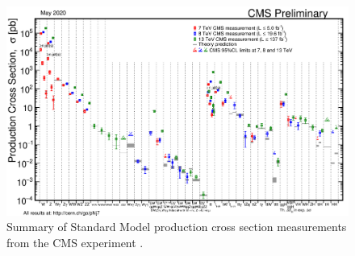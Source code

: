 \begin{figure}[hbtp]
\centering
\includegraphics[scale=0.13]{figures/intro/cms_sm_measurements.png}
\caption{Summary of Standard Model production cross section measurements from the CMS experiment \cite{cms_sm_public_results}.}
\label{cms_sm_measurements}
\end{figure}